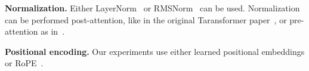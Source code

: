 \textbf{Normalization.} Either LayerNorm~\citep{ba2016layer} or RMSNorm~\citep{zhang2019root} can be used. Normalization can be performed post-attention, like in the original Taransformer paper~\citep{vaswani2017attention}, or pre-attention as in~\citep{xiong2020layer}.

\textbf{Positional encoding.} Our experiments use either learned positional embeddings or RoPE~\citep{suRoFormerEnhancedTransformer2023}.

